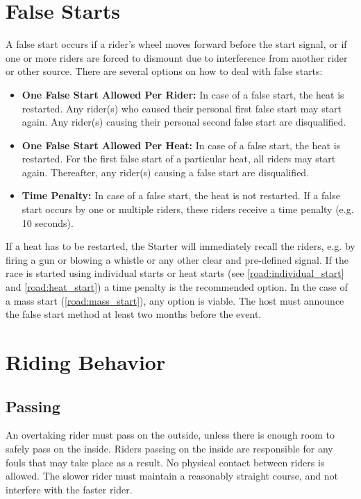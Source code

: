 \section{False Starts}
A false start occurs if a rider's wheel moves forward before the start signal, or if one or more riders are forced to dismount due to interference from another rider or other source. There are several options on how to deal with false starts:
\begin{itemize}
\item \textbf{One False Start Allowed Per Rider:}
In case of a false start, the heat is restarted. Any rider(s) who caused their personal first false start may start again. Any rider(s) causing their personal second false start are disqualified.
\item \textbf{One False Start Allowed Per Heat:} 
In case of a false start, the heat is restarted. For the first false start of a particular heat, all riders may start again. Thereafter, any rider(s) causing a false start are disqualified.
\item \textbf{Time Penalty:}
In case of a false start, the heat is not restarted. If a false start occurs by one or multiple riders, these riders receive a time penalty (e.g. 10 seconds).
\end{itemize}
If a heat has to be restarted, the Starter will immediately recall the riders, e.g. by firing a gun or blowing a whistle or any other clear and pre-defined signal. If the race is started using individual starts or heat starts (see \ref{road:individual_start} and \ref{road:heat_start}) a time penalty is the recommended option. In the case of a mass start (\ref{road:mass_start}), any option is viable. The host must announce the false start method at least two months before the event.

\section{Riding Behavior}

\subsection{Passing}
An overtaking rider must pass on the outside, unless there is enough room to safely pass on the inside. Riders passing on the inside are responsible for any fouls that may take place as a result. No physical contact between riders is allowed. The slower rider must maintain a reasonably straight course, and not interfere with the faster rider.

